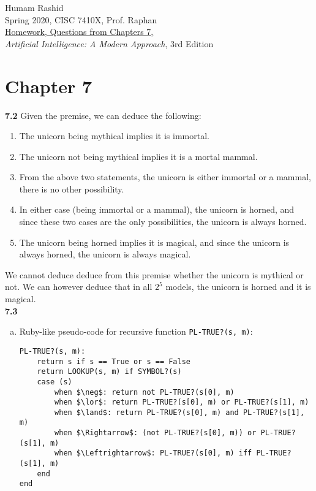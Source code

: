 \documentclass{scrartcl}
\begin{document}
\begin{flushleft}
Humam Rashid\\
Spring 2020, CISC 7410X, Prof. Raphan\\
\underline{Homework, Questions from Chapters 7,}\\
\textit{Artificial Intelligence: A Modern Approach}, 3rd Edition
\end{flushleft}

\section*{Chapter 7}
\textbf{7.2} Given the premise, we can deduce the following:
\begin{enumerate}
    \item The unicorn being mythical implies it is immortal.
    \item The unicorn not being mythical implies it is a mortal mammal.
    \item From the above two statements, the unicorn is either immortal or a mammal, there is no
        other possibility.
    \item In either case (being immortal or a mammal), the unicorn is horned, and since these two
        cases are the only possibilities, the unicorn is always horned.
    \item The unicorn being horned implies it is magical, and since the unicorn is always horned,
        the unicorn is always magical.
\end{enumerate}
We cannot deduce deduce from this premise whether the unicorn is mythical or not. We can however
deduce that in all $2^5$ models, the unicorn is horned and it is magical.
\bigskip
\\
\textbf{7.3}
\begin{enumerate}[(a)]
    \item Ruby-like pseudo-code for recursive function \verb|PL-TRUE?(s, m)|:
        \begin{lstlisting}
PL-TRUE?(s, m):
    return s if s == True or s == False
    return LOOKUP(s, m) if SYMBOL?(s)
    case (s)
        when $\neg$: return not PL-TRUE?(s[0], m)
        when $\lor$: return PL-TRUE?(s[0], m) or PL-TRUE?(s[1], m)
        when $\land$: return PL-TRUE?(s[0], m) and PL-TRUE?(s[1], m)
        when $\Rightarrow$: (not PL-TRUE?(s[0], m)) or PL-TRUE?(s[1], m)
        when $\Leftrightarrow$: PL-TRUE?(s[0], m) iff PL-TRUE?(s[1], m)
    end
end
        \end{lstlisting}
\end{enumerate}
\end{document}
